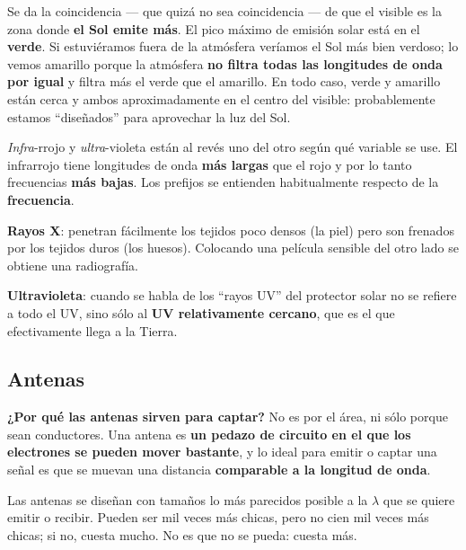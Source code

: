 \documentclass[12pt,a4paper]{article}
\begin{document}
\begin{notebox}
Se da la coincidencia --- que quizá no sea coincidencia --- de que el visible es
la zona donde \textbf{el Sol emite más}. El pico máximo de emisión solar está en
el \textbf{verde}. Si estuviéramos fuera de la atmósfera veríamos el Sol más bien
verdoso; lo vemos amarillo porque la atmósfera \textbf{no filtra todas las
longitudes de onda por igual} y filtra más el verde que el amarillo. En todo caso,
verde y amarillo están cerca y ambos aproximadamente en el centro del visible:
probablemente estamos \enquote{diseñados} para aprovechar la luz del Sol.
\end{notebox}

\begin{warnbox}
\emph{Infra}-rrojo y \emph{ultra}-violeta están al revés uno del otro según qué
variable se use. El infrarrojo tiene longitudes de onda \textbf{más largas} que el
rojo y por lo tanto frecuencias \textbf{más bajas}. Los prefijos se entienden
habitualmente respecto de la \textbf{frecuencia}.
\end{warnbox}

\begin{notebox}
\textbf{Rayos X}: penetran fácilmente los tejidos poco densos (la piel) pero son
frenados por los tejidos duros (los huesos). Colocando una película sensible del
otro lado se obtiene una radiografía.

\textbf{Ultravioleta}: cuando se habla de los \enquote{rayos UV} del protector
solar no se refiere a todo el UV, sino sólo al \textbf{UV relativamente cercano},
que es el que efectivamente llega a la Tierra.
\end{notebox}

\subsection{Antenas}

\textbf{¿Por qué las antenas sirven para captar?} No es por el área, ni sólo
porque sean conductores. Una antena es \textbf{un pedazo de circuito en el que los
electrones se pueden mover bastante}, y lo ideal para emitir o captar una señal es
que se muevan una distancia \textbf{comparable a la longitud de onda}.

\begin{keybox}
Las antenas se diseñan con tamaños lo más parecidos posible a la $\lambda$ que se
quiere emitir o recibir. Pueden ser mil veces más chicas, pero no cien mil veces
más chicas; si no, cuesta mucho. No es que no se pueda: cuesta más.
\end{keybox}
\end{document}
